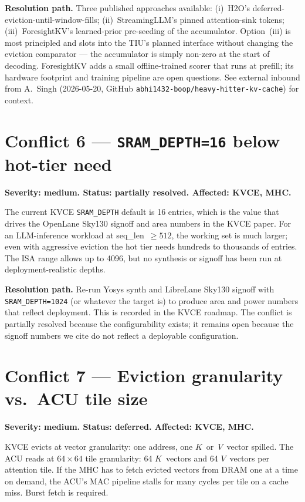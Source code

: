\documentclass[11pt]{article}
\begin{document}
\textbf{Resolution path.} Three published approaches available:
(i)~H2O's deferred-eviction-until-window-fills; (ii)~StreamingLLM's
pinned attention-sink tokens; (iii)~ForesightKV's learned-prior
pre-seeding of the accumulator. Option~(iii) is most principled and
slots into the TIU's planned interface without changing the
eviction comparator --- the accumulator is simply non-zero at the
start of decoding. ForesightKV adds a small offline-trained scorer
that runs at prefill; its hardware footprint and training pipeline
are open questions. See external inbound from A.~Singh (2026-05-20,
GitHub \texttt{abhi1432-boop/heavy-hitter-kv-cache}) for context.

\section{Conflict 6 --- \texttt{SRAM\_DEPTH=16} below hot-tier need}
\label{sec:c6}

\textbf{Severity: medium. Status: partially resolved. Affected: KVCE, MHC.}

The current KVCE \texttt{SRAM\_DEPTH} default is 16 entries, which
is the value that drives the OpenLane Sky130 signoff and area
numbers in the KVCE paper. For an LLM-inference workload at
seq\_len~$\geq 512$, the working set is much larger; even with
aggressive eviction the hot tier needs hundreds to thousands of
entries. The ISA range allows up to 4096, but no synthesis or
signoff has been run at deployment-realistic depths.

\textbf{Resolution path.} Re-run Yosys synth and LibreLane Sky130
signoff with \texttt{SRAM\_DEPTH=1024} (or whatever the target is)
to produce area and power numbers that reflect deployment.
This is recorded in the KVCE roadmap. The conflict is partially
resolved because the configurability exists; it remains open
because the signoff numbers we cite do not reflect a deployable
configuration.

\section{Conflict 7 --- Eviction granularity vs.\ ACU tile size}
\label{sec:c7}

\textbf{Severity: medium. Status: deferred. Affected: KVCE, MHC.}

KVCE evicts at vector granularity: one address, one
$K$~or~$V$~vector spilled. The ACU reads at $64 \times 64$ tile
granularity: 64 $K$~vectors and 64 $V$~vectors per attention tile.
If the MHC has to fetch evicted vectors from DRAM one at a time
on demand, the ACU's MAC pipeline stalls for many cycles per tile
on a cache miss. Burst fetch is required.
\end{document}
